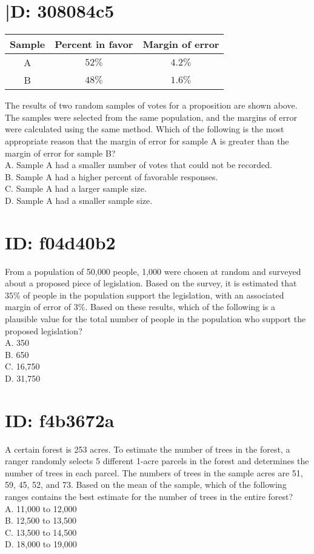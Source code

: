 \section*{|D: 308084c5}
\begin{center}
\begin{tabular}{|c|c|c|}
\hline
Sample & Percent in favor & Margin of error \\
\hline
A & $52 \%$ & $4.2 \%$ \\
\hline
B & $48 \%$ & $1.6 \%$ \\
\hline
\end{tabular}
\end{center}

The results of two random samples of votes for a proposition are shown above. The samples were selected from the same population, and the margins of error were calculated using the same method. Which of the following is the most appropriate reason that the margin of error for sample A is greater than the margin of error for sample B?\\
A. Sample A had a smaller number of votes that could not be recorded.\\
B. Sample A had a higher percent of favorable responses.\\
C. Sample A had a larger sample size.\\
D. Sample A had a smaller sample size.

\section*{ID: f04d40b2}
From a population of 50,000 people, 1,000 were chosen at random and surveyed about a proposed piece of legislation. Based on the survey, it is estimated that $35 \%$ of people in the population support the legislation, with an associated margin of error of $3 \%$. Based on these results, which of the following is a plausible value for the total number of people in the population who support the proposed legislation?\\
A. 350\\
B. 650\\
C. 16,750\\
D. 31,750

\section*{ID: f4b3672a}
A certain forest is 253 acres. To estimate the number of trees in the forest, a ranger randomly selects 5 different 1-acre parcels in the forest and determines the number of trees in each parcel. The numbers of trees in the sample acres are 51, 59, 45, 52, and 73. Based on the mean of the sample, which of the following ranges contains the best estimate for the number of trees in the entire forest?\\
A. 11,000 to 12,000\\
B. 12,500 to 13,500\\
C. 13,500 to 14,500\\
D. 18,000 to 19,000


